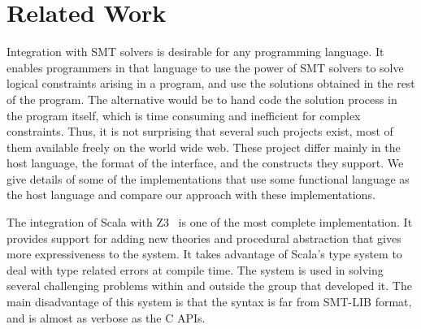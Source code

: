 \section{Related Work}
Integration with SMT solvers is desirable for any programming
language. It enables programmers in that language to use the
power of SMT solvers to solve logical constraints arising in
a program, and use the solutions obtained in the rest of the
program. The alternative would be to hand code the solution
process in the program itself, which is time consuming and
inefficient for complex constraints. Thus, it is not
surprising that several such projects exist, most of them
available freely on the world wide web. These project differ
mainly in the host language, the format of the interface, and
the constructs they support.  We give details of some of
the implementations that use some functional language as the
host language and compare our approach with these
implementations.  

The integration of Scala with Z3~\cite{scalaz3} is one of the
most complete implementation. It provides support for adding
new theories and procedural abstraction that gives more
expressiveness to the system. It takes advantage of Scala's
type system to deal with type related errors at compile time.
The system is used in solving several challenging problems
within and outside the group that developed it. The main
disadvantage of this system is that the syntax is far from
SMT-LIB format, and is almost as verbose as the C APIs.

